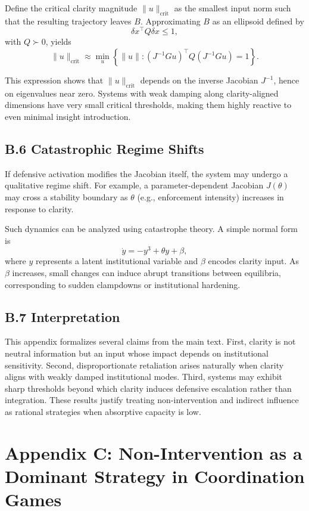 \documentclass[11pt]{article}
\begin{document}
Define the critical clarity magnitude \(\|u\|_{\mathrm{crit}}\) as the smallest input norm such that the resulting trajectory leaves \(B\). Approximating \(B\) as an ellipsoid defined by
\[
\delta x^\top Q \delta x \le 1,
\]
with \(Q\succ 0\), yields
\[
\|u\|_{\mathrm{crit}} \approx
\min_{u} \left\{ \|u\| : (J^{-1} G u)^\top Q (J^{-1} G u) = 1 \right\}.
\]

This expression shows that \(\|u\|_{\mathrm{crit}}\) depends on the inverse Jacobian \(J^{-1}\), hence on eigenvalues near zero. Systems with weak damping along clarity-aligned dimensions have very small critical thresholds, making them highly reactive to even minimal insight introduction.

\subsection{B.6 Catastrophic Regime Shifts}

If defensive activation modifies the Jacobian itself, the system may undergo a qualitative regime shift. For example, a parameter-dependent Jacobian \(J(\theta)\) may cross a stability boundary as \(\theta\) (e.g., enforcement intensity) increases in response to clarity.

Such dynamics can be analyzed using catastrophe theory. A simple normal form is
\[
\dot{y} = -y^3 + \theta y + \beta,
\]
where \(y\) represents a latent institutional variable and \(\beta\) encodes clarity input. As \(\beta\) increases, small changes can induce abrupt transitions between equilibria, corresponding to sudden clampdowns or institutional hardening.

\subsection{B.7 Interpretation}

This appendix formalizes several claims from the main text. First, clarity is not neutral information but an input whose impact depends on institutional sensitivity. Second, disproportionate retaliation arises naturally when clarity aligns with weakly damped institutional modes. Third, systems may exhibit sharp thresholds beyond which clarity induces defensive escalation rather than integration. These results justify treating non-intervention and indirect influence as rational strategies when absorptive capacity is low.

\section{Appendix C: Non-Intervention as a Dominant Strategy in Coordination Games}
\label{app:nonintervention}
\end{document}
